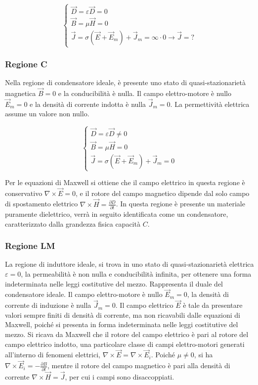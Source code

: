 \documentclass{article}
\numberwithin{equation}{subsection}
\begin{document}
\begin{equation*}
    \begin{cases}
        \vec{D}=\varepsilon\vec{D}=0\\
        \vec{B}=\mu\vec{H}=0\\
        \vec{J}=\sigma(\vec{E}+\vec{E}_m)+\vec{J}_m=\infty\cdot0\to\vec{J}=?
    \end{cases}
\end{equation*}

\subsubsection{Regione C}

Nella regione di condensatore ideale, è presente uno stato di quasi-stazionarietà magnetica $\vec{B}=0$ e la conducibilità è nulla. Il campo elettro-motore è nullo $\vec{E}_m=0$ 
e la densità di corrente indotta è nulla $\vec{J}_m=0$. La permettività elettrica assume un valore non nullo. 

\begin{equation*}
    \begin{cases}
        \vec{D}=\varepsilon\vec{D}\neq0\\
        \vec{B}=\mu\vec{H}=0\\
        \vec{J}=\sigma(\vec{E}+\vec{E}_m)+\vec{J}_m=0
    \end{cases}
\end{equation*}

Per le equazioni di Maxwell si ottiene che il campo elettrico in questa regione è conservativo $\nabla\times\vec{E}=0$, e il rotore del campo magnetico dipende dal solo campo 
di spostamento elettrico $\nabla\times\vec{H}=\displaystyle\frac{\partial D}{\partial t}$. In questa regione è presente un materiale puramente dielettrico, verrà in seguito 
identificata come un condensatore, caratterizzato dalla grandezza fisica capacità $C$.

\subsubsection{Regione LM}

La regione di induttore ideale, si trova in uno stato di quasi-stazionarietà elettrica $\varepsilon=0$, la permeabilità è non nulla e conducibilità infinita, per 
ottenere una forma indeterminata nelle leggi costitutive del mezzo. Rappresenta 
il duale del condensatore ideale. Il campo elettro-motore è nullo $\vec{E}_m=0$, la densità di corrente di induzione è nulla $\vec{J}_m=0$. Il campo elettrico $\vec{E}$ è tale 
da presentare valori sempre finiti di densità di corrente, ma non ricavabili dalle equazioni di Maxwell, poiché si presenta in forma indeterminata nelle leggi costitutive del mezzo. 
Si ricava da Maxwell che il rotore del campo elettrico è pari al rotore del campo elettrico indotto, una particolare classe di campi elettro-motori generati all'interno di 
fenomeni elettrici, $\nabla\times\vec{E}=\nabla\times\vec{E}_i$. 
Poiché $\mu\neq0$, si ha $\nabla\times\vec{E}_i=\displaystyle-\frac{\partial B}{\partial t}$, mentre il rotore del campo magnetico è pari alla densità di corrente 
$\nabla\times\vec{H}=\vec{J}$, per cui i campi sono disaccoppiati. 
\end{document}
